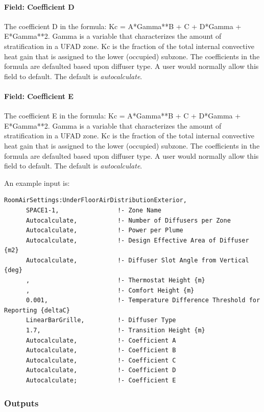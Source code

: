 \paragraph{Field: Coefficient D}\label{field-coefficient-d-1}

The coefficient D in the formula: Kc = A*Gamma**B + C + D*Gamma + E*Gamma**2. Gamma is a variable that characterizes the amount of stratification in a UFAD zone. Kc is the fraction of the total internal convective heat gain that is assigned to the lower (occupied) subzone. The coefficients in the formula are defaulted based upon diffuser type. A user would normally allow this field to default. The default is \emph{autocalculate}.

\paragraph{Field: Coefficient E}\label{field-coefficient-e-1}

The coefficient E in the formula: Kc = A*Gamma**B + C + D*Gamma + E*Gamma**2. Gamma is a variable that characterizes the amount of stratification in a UFAD zone. Kc is the fraction of the total internal convective heat gain that is assigned to the lower (occupied) subzone. The coefficients in the formula are defaulted based upon diffuser type. A user would normally allow this field to default. The default is \emph{autocalculate}.

An example input is:

\begin{lstlisting}
RoomAirSettings:UnderFloorAirDistributionExterior,
      SPACE1-1,                !- Zone Name
      Autocalculate,           !- Number of Diffusers per Zone
      Autocalculate,           !- Power per Plume
      Autocalculate,           !- Design Effective Area of Diffuser {m2}
      Autocalculate,           !- Diffuser Slot Angle from Vertical {deg}
      ,                        !- Thermostat Height {m}
      ,                        !- Comfort Height {m}
      0.001,                   !- Temperature Difference Threshold for Reporting {deltaC}
      LinearBarGrille,         !- Diffuser Type
      1.7,                     !- Transition Height {m}
      Autocalculate,           !- Coefficient A
      Autocalculate,           !- Coefficient B
      Autocalculate,           !- Coefficient C
      Autocalculate,           !- Coefficient D
      Autocalculate;           !- Coefficient E
\end{lstlisting}

\subsubsection{Outputs}\label{roomairsettingsunderfloorairdistributionexterior-outputs}

